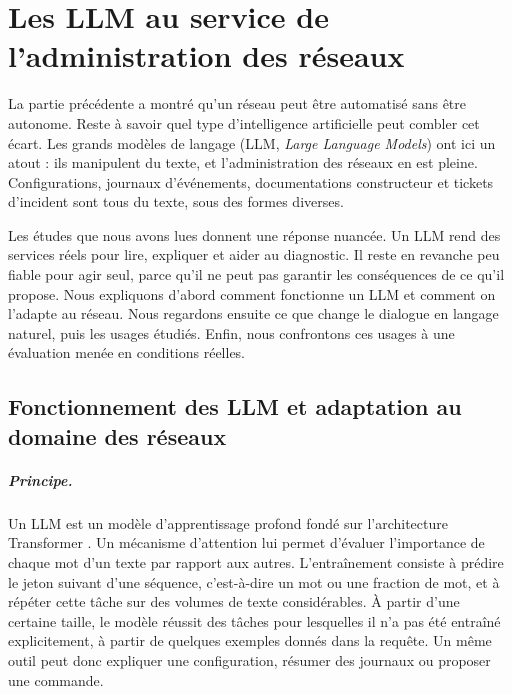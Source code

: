 \chapter{Les LLM au service de l'administration des réseaux}
\label{chap:partie-2}

La partie précédente a montré qu'un réseau peut être automatisé sans être autonome. Reste à savoir quel type d'intelligence artificielle peut combler cet écart. Les grands modèles de langage (LLM, \emph{Large Language Models}) ont ici un atout : ils manipulent du texte, et l'administration des réseaux en est pleine. Configurations, journaux d'événements, documentations constructeur et tickets d'incident sont tous du texte, sous des formes diverses.

Les études que nous avons lues donnent une réponse nuancée. Un LLM rend des services réels pour lire, expliquer et aider au diagnostic. Il reste en revanche peu fiable pour agir seul, parce qu'il ne peut pas garantir les conséquences de ce qu'il propose. Nous expliquons d'abord comment fonctionne un LLM et comment on l'adapte au réseau. Nous regardons ensuite ce que change le dialogue en langage naturel, puis les usages étudiés. Enfin, nous confrontons ces usages à une évaluation menée en conditions réelles.

\section{Fonctionnement des LLM et adaptation au domaine des réseaux}

\paragraph{Principe.}
Un LLM est un modèle d'apprentissage profond fondé sur l'architecture Transformer \cite{vaswani2017}. Un mécanisme d'attention lui permet d'évaluer l'importance de chaque mot d'un texte par rapport aux autres. L'entraînement consiste à prédire le jeton suivant d'une séquence, c'est-à-dire un mot ou une fraction de mot, et à répéter cette tâche sur des volumes de texte considérables. À partir d'une certaine taille, le modèle réussit des tâches pour lesquelles il n'a pas été entraîné explicitement, à partir de quelques exemples donnés dans la requête. Un même outil peut donc expliquer une configuration, résumer des journaux ou proposer une commande.


